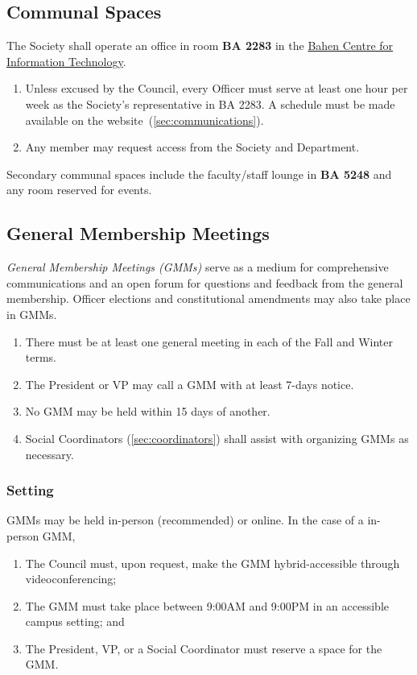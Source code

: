 \subsection{Communal Spaces}\label{sec:communal-spaces}
The Society shall operate an office in room \textbf{BA 2283} in the
\href{https://map.utoronto.ca/?id=1809#!m/494470}{Bahen Centre for Information
      Technology}.

\begin{enumerate}
      \item Unless excused by the Council, every Officer must serve at least one hour per
            week as the Society's representative in BA 2283. A schedule must be made
            available on the website~(\ref{sec:communications}).
      \item Any member may request access from the Society and Department.
\end{enumerate}
Secondary communal spaces include the faculty/staff lounge in \textbf{BA 5248}
and any room reserved for events.

\subsection{General Membership Meetings}
\textit{General Membership Meetings (GMMs)} serve as a medium for comprehensive communications and an open forum for questions and feedback from the general membership. Officer elections and constitutional amendments may also take place in GMMs.

\begin{enumerate}
      \item There must be at least one general meeting in each of the Fall and Winter
            terms.
      \item The President or VP may call a GMM with at least 7-days notice.
      \item No GMM may be held within 15 days of another.
      \item Social Coordinators (\ref{sec:coordinators}) shall assist with organizing GMMs
            as necessary.
\end{enumerate}

\subsubsection{Setting}
GMMs may be held in-person (recommended) or online. In the case of a in-person
GMM,

\begin{enumerate}
      \item The Council must, upon request, make the GMM hybrid-accessible through
            videoconferencing;
      \item The GMM must take place between 9:00AM and 9:00PM in an accessible campus
            setting; and
      \item The President, VP, or a Social Coordinator must reserve a space for the GMM.\@
\end{enumerate}

